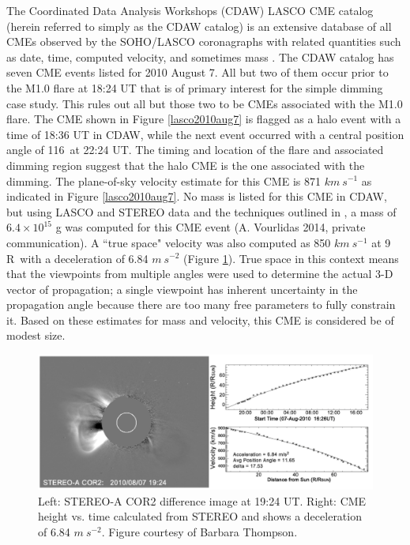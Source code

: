 The Coordinated Data Analysis Workshops (CDAW) LASCO CME catalog (herein referred to simply as the CDAW catalog) is an extensive database of all CMEs observed by the SOHO/LASCO coronagraphs with related quantities such as date, time, computed velocity, and sometimes mass \citep{Gopalswamy2009}. The CDAW catalog has seven CME events listed for 2010 August 7. All but two of them occur prior to the M1.0 flare at 18:24 UT that is of primary interest for the simple dimming case study. This rules out all but those two to be CMEs associated with the M1.0 flare. The CME shown in Figure \ref{lasco2010aug7} is flagged as a halo event with a time of 18:36 UT in CDAW, while the next event occurred with a central position angle of 116\degree\ at 22:24 UT. The timing and location of the flare and associated dimming region suggest that the halo CME is the one associated with the dimming. The plane-of-sky velocity estimate for this CME is 871 $km\ s^{-1}$ as indicated in Figure \ref{lasco2010aug7}. No mass is listed for this CME in CDAW, but using LASCO and STEREO data and the techniques outlined in \citet{Colaninno2009}, a mass of $6.4 \times 10^{15}$ g was computed for this CME event (A. Vourlidas 2014, private communication). A ``true space" velocity was also computed as 850 $km\ s^{-1}$ at 9 R\astrosun\ with a deceleration of 6.84 $m\ s^{-2}$ (Figure \ref{stereo2010aug7}). True space in this context means that the viewpoints from multiple angles were used to determine the actual 3-D vector of propagation; a single viewpoint has inherent uncertainty in the propagation angle  because there are too many free parameters to fully constrain it. Based on these estimates for mass and velocity, this CME is considered be of modest size.

\begin{figure}[!h]
    \begin{center}
	    \includegraphics[width=150mm]{Images/Stereo2010Aug7Cme.png}
    \end{center}
    \caption[LASCO coronagraph data for 2010 August 7 event]{
        Left: STEREO-A COR2 difference image at 19:24 UT. Right: CME height vs. time calculated from STEREO and shows a 
        deceleration of 6.84 $m\ s^{-2}$. Figure courtesy of Barbara Thompson. 
	}
    \label{stereo2010aug7}
\end{figure}

